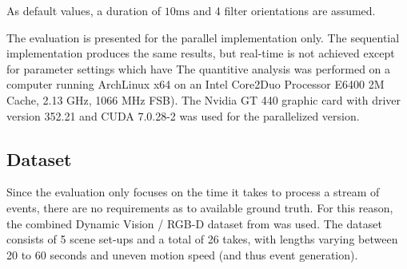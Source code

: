 As default values, a duration of $10\mathrm{ms}$ and 4 filter orientations are assumed.

The evaluation is presented for the parallel implementation only.
The sequential implementation produces the same results, but real-time is not achieved except for parameter settings which have 
The quantitive analysis was performed on a computer running ArchLinux x64 on an Intel Core2Duo Processor E6400 2M Cache, 2.13 GHz, 1066 MHz FSB).
The Nvidia GT 440 graphic card with driver version 352.21 and CUDA 7.0.28-2 was used for the parallelized version.

\subsection{Dataset}
Since the evaluation only focuses on the time it takes to process a stream of events, there are no requirements as to available ground truth.
For this reason, the combined Dynamic Vision / RGB-D dataset from \cite{weikersdorfer2014event} was used.
The dataset consists of 5 scene set-ups and a total of 26 takes, with lengths varying between 20 to 60 seconds and uneven motion speed (and thus event generation).

